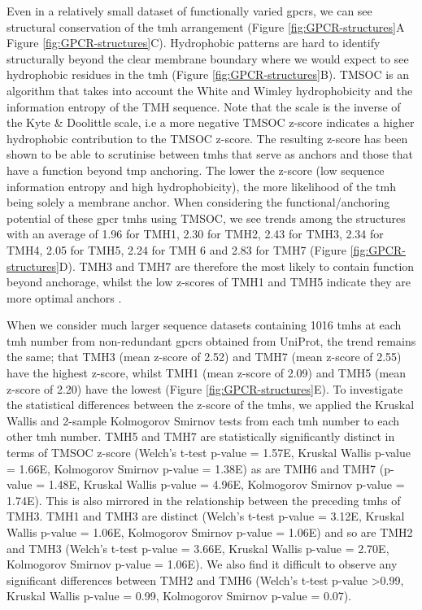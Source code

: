 Even in a relatively small dataset of functionally varied \gls{gpcr}s, we can see structural conservation of the \gls{tmh} arrangement (Figure \ref{fig:GPCR-structures}A Figure \ref{fig:GPCR-structures}C).
Hydrophobic patterns are hard to identify structurally beyond the clear membrane boundary where we would expect to see hydrophobic residues in the \gls{tmh} (Figure \ref{fig:GPCR-structures}B).
TMSOC \cite{Wong2011, Wong2012} is an algorithm that takes into account the White and Wimley hydrophobicity \cite{White1999} and the information entropy of the TMH sequence.
Note that the scale is the inverse of the Kyte \& Doolittle scale, i.e a more negative TMSOC z-score indicates a higher hydrophobic contribution to the TMSOC z\--score.
The resulting z\--score has been shown to be able to scrutinise between \gls{tmh}s that serve as anchors and those that have a function beyond \gls{tmp} anchoring.
The lower the z\--score (low sequence information entropy and high hydrophobicity), the more likelihood of the \gls{tmh} being solely a membrane anchor.
When considering the functional/anchoring potential of these \gls{gpcr} \gls{tmh}s  using TMSOC, we see trends among the structures with an average of 1.96 for TMH1, 2.30 for TMH2, 2.43 for TMH3, 2.34 for TMH4, 2.05 for TMH5, 2.24 for TMH 6 and 2.83 for TMH7 (Figure \ref{fig:GPCR-structures}D).
TMH3 and TMH7 are therefore the most likely to contain function beyond anchorage, whilst the low z\--scores of TMH1 and TMH5 indicate they are more optimal anchors \cite{Baker2017}.

When we consider much larger sequence datasets containing 1016 \gls{tmh}s at each \gls{tmh} number from non-redundant \gls{gpcr}s obtained from UniProt, the trend remains the same; that TMH3 (mean z\--score of 2.52) and TMH7 (mean z\--score of 2.55) have the highest z\--score, whilst TMH1 (mean z\--score of 2.09) and TMH5 (mean z\--score of 2.20) have the lowest (Figure \ref{fig:GPCR-structures}E).
To investigate the statistical differences between the z\--score of the \gls{tmh}s, we applied the Kruskal Wallis and 2-sample Kolmogorov Smirnov tests from each \gls{tmh} number to each other \gls{tmh} number.
TMH5 and TMH7 are statistically significantly distinct in terms of TMSOC z\--score (Welch's t-test p\--value = 1.57E, Kruskal Wallis p\--value = 1.66E, Kolmogorov Smirnov p\--value = 1.38E) as are TMH6 and TMH7 (p\--value = 1.48E, Kruskal Wallis p\--value = 4.96E, Kolmogorov Smirnov p\--value = 1.74E).
This is also mirrored in the relationship between the preceding \gls{tmh}s of TMH3.
TMH1 and TMH3 are distinct (Welch's t-test p\--value = 3.12E, Kruskal Wallis p\--value = 1.06E, Kolmogorov Smirnov p\--value = 1.06E) and so are TMH2 and TMH3 (Welch's t-test p\--value = 3.66E, Kruskal Wallis p\--value = 2.70E, Kolmogorov Smirnov p\--value = 1.06E).
We also find it difficult to observe any significant differences between TMH2 and TMH6 (Welch's t\--test p\--value \textgreater 0.99, Kruskal Wallis p\--value = 0.99, Kolmogorov Smirnov p\--value = 0.07).

